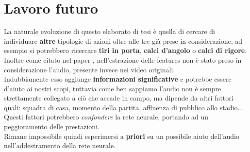 \section{Lavoro futuro}
La naturale evoluzione di questo elaborato di tesi è quella di cercare di individuare \textbf{altre} tipologie di azioni oltre alle tre già prese in considerazione, ad esempio si potrebbero ricercare \textbf{tiri in porta}, \textbf{calci d'angolo} o \textbf{calci di rigore}.
\\Inoltre come citato nel paper \citep{soccerNet}, nell'estrazione delle features non è stato preso in considerazione l'audio, presente invece nei video originali.
\\Indubbiamente esso aggiunge \textbf{informazioni significative} e potrebbe essere d'aiuto ai nostri scopi, tuttavia come ben sappiamo l'audio non è sempre strettamente collegato a ciò che accade in campo, ma dipende da altri fattori quali: squadra di casa, momento della partita, affluenza di pubblico allo stadio\ldots
\\Questi fattori potrebbero \textit{confondere} la rete neurale, portando ad un peggioramento delle prestazioni.
\\Rimane impossibile quindi esperimersi a \textbf{priori} su un possibile aiuto dell'audio nell'addestramento della rete neurale.
